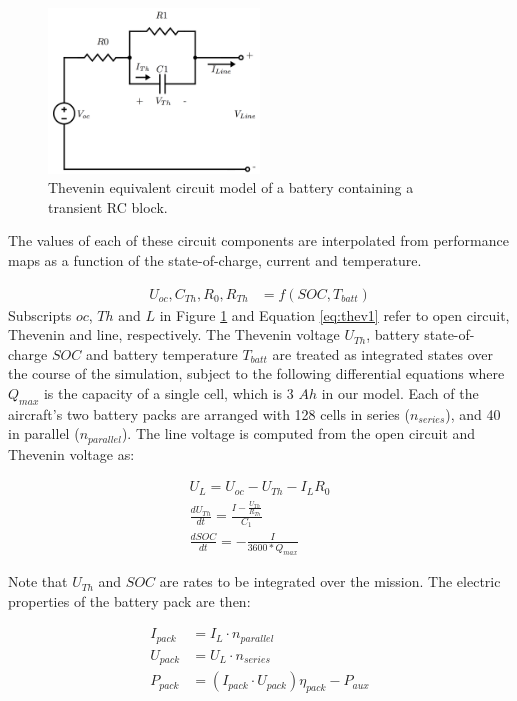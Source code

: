 \documentclass[]{aiaa-tc}%
\begin{document}
\begin{figure}[!htb]%
	\centering
	\includegraphics[width=0.5\textwidth]{figures/circuitv2.png}
	\caption{Thevenin equivalent circuit model of a battery containing a transient RC block.}
	\label{fig:thevenin}
\end{figure}

The values of each of these circuit components are interpolated from performance maps as a function of the state-of-charge, current and temperature.

\begin{align}
U_{oc},C_{Th},R_0,R_{Th} &= f(SOC, T_{batt}) \label{eq:thev1}
\end{align}
%
Subscripts $oc$, $Th$ and $L$ in Figure \ref{fig:thevenin} and Equation \ref{eq:thev1} refer to open circuit, Thevenin and line, respectively. The Thevenin voltage $U_{Th}$, battery state-of-charge $SOC$ and battery temperature $T_{batt}$ are treated as integrated states over the course of the simulation, subject to the following differential equations \cite{Hongwen}
where $Q_{max}$ is the capacity of a single cell, which is 3 $Ah$ in our model.  Each of the aircraft's two battery packs are arranged with 128 cells in series ($n_{series}$), and 40 in parallel ($n_{parallel}$).  The line voltage is computed from the open circuit and Thevenin voltage as:

\begin{align}
U_L = U_{oc} - U_{Th} - I_L R_0 \label{eq:U_L} \\
\frac{d U_{Th}}{d t} = \frac{I-\frac{U_{Th}}{R_{Th}}}{C_1}\\
\frac{d SOC}{d t} = -\frac{I}{3600*Q_{max}}
\end{align}

Note that $U_{Th}$ and $SOC$ are rates to be integrated over the mission. The electric properties of the battery pack are then:

\begin{align}
I_{pack} &= I_L \cdot n_{parallel} \label{eq:I_pack} \\
U_{pack} &= U_L \cdot n_{series} \label{eq:U_pack} \\
P_{pack} &= (I_{pack} \cdot U_{pack}) \eta_{pack} - P_{aux} \label{eq:P_pack}
\end{align}
\end{document}
